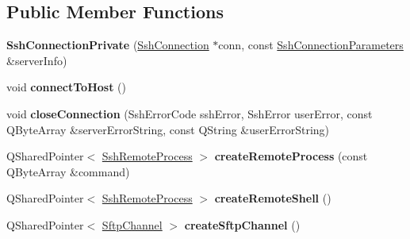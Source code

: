 \subsection*{Public Member Functions}
\begin{DoxyCompactItemize}
\item 
\mbox{\label{class_q_ssh_1_1_internal_1_1_ssh_connection_private_a7d527fb17d5c3b4dc72fab7dd72af01c}} 
{\bfseries Ssh\+Connection\+Private} (\mbox{\hyperlink{class_q_ssh_1_1_ssh_connection}{Ssh\+Connection}} $\ast$conn, const \mbox{\hyperlink{class_q_ssh_1_1_ssh_connection_parameters}{Ssh\+Connection\+Parameters}} \&server\+Info)
\item 
\mbox{\label{class_q_ssh_1_1_internal_1_1_ssh_connection_private_a3a4a829f30fcd68f903aed59a1c49731}} 
void {\bfseries connect\+To\+Host} ()
\item 
\mbox{\label{class_q_ssh_1_1_internal_1_1_ssh_connection_private_a46b3a871db79f0c055dcd3e9b950cac8}} 
void {\bfseries close\+Connection} (Ssh\+Error\+Code ssh\+Error, Ssh\+Error user\+Error, const Q\+Byte\+Array \&server\+Error\+String, const Q\+String \&user\+Error\+String)
\item 
\mbox{\label{class_q_ssh_1_1_internal_1_1_ssh_connection_private_a112064b373648f982cae20e757b2e347}} 
Q\+Shared\+Pointer$<$ \mbox{\hyperlink{class_q_ssh_1_1_ssh_remote_process}{Ssh\+Remote\+Process}} $>$ {\bfseries create\+Remote\+Process} (const Q\+Byte\+Array \&command)
\item 
\mbox{\label{class_q_ssh_1_1_internal_1_1_ssh_connection_private_a62b933e9c7e02129c80877a633698846}} 
Q\+Shared\+Pointer$<$ \mbox{\hyperlink{class_q_ssh_1_1_ssh_remote_process}{Ssh\+Remote\+Process}} $>$ {\bfseries create\+Remote\+Shell} ()
\item 
\mbox{\label{class_q_ssh_1_1_internal_1_1_ssh_connection_private_aa31e6fd1bf5d3c8d8be35d288db0306d}} 
Q\+Shared\+Pointer$<$ \mbox{\hyperlink{class_q_ssh_1_1_sftp_channel}{Sftp\+Channel}} $>$ {\bfseries create\+Sftp\+Channel} ()

\end{DoxyCompactItemize}
